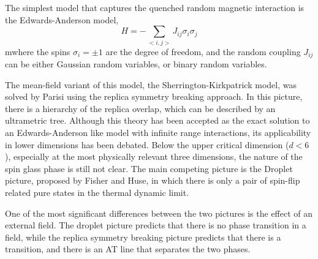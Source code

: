 The simplest model that captures the quenched random magnetic interaction
is the Edwards-Anderson model\cite{Edwards-Anderson1975},
\begin{equation}
  \label{eq:11}
  H=-\sum_{<i,j>}J_{ij}\sigma_i\sigma_j
\end{equation}
mwhere the spins $\sigma_i=\pm 1$ are the degree of freedom, and the random coupling
$J_{ij}$ can be either Gaussian random variables, or binary random variables.

The mean-field variant of this model, the Sherrington-Kirkpatrick model\cite{Sherrington-Kirkpatrick1978,Sherrington-Kirkpatrick-1975}, was 
solved by Parisi\cite{Parisi-1980a,Parisi-1980b,Parisi1980} using the replica 
symmetry breaking approach. In this picture,
there is a hierarchy of the replica overlap, which can be described by an ultrametric
tree. Although this theory has been accepted as the exact solution to an Edwards-Anderson
like model with infinite range interactions, its applicability in lower dimensions 
has been debated. Below the upper critical dimension ($d<6$)\cite{Harris-Lubensky-Chen-1976,Tasaki-1989,Green-Moore-Bray-1983}, 
especially at the most
physically relevant three dimensions, the nature of the spin glass phase is still not clear. 
The main competing picture is the Droplet picture, proposed by Fisher and Huse\citep{Fisher-Huse-1987,Fisher-Huse-1988}, in which 
there is only a pair of spin-flip related pure states in the thermal dynamic
limit.


\iffalse
A system is said to present annealed disorder when some parameters entering 
its definition are random variables, but whose evolution is related to that 
of the degrees of freedom defining the system. For example, in the case of 
structural glasses, whose Hamiltonian takes the form,
\begin{equation}
  \label{eq:12}
  H=\sum_{ij}V(r_j-r_j)
\end{equation}
where the degrees of freedom $r_i$ are the positions of the particles, and the 
function $V(r)$ is a potential. Even though there is no quenched disorder in
the Hamiltonian, at low temperature, the system stays in a frozen glassy state, 
and each particle is in a different, disordered environment.
\fi

One of the most significant differences between the two pictures is the effect 
of an external field\cite{Young-Katzgraber2004}. The droplet picture predicts that there is no phase transition
in a field, while the replica symmetry breaking picture predicts that there is a 
transition, and there is an AT line that separates the two phases. 

